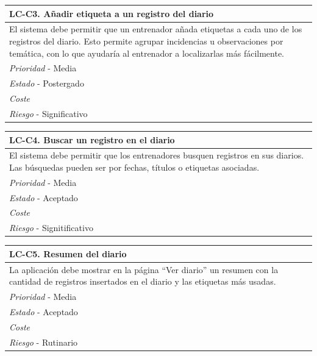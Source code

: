 	\begin{center}
		\begin{tabularx}{15cm}{|X|}
			\hline 
				\bf{LC-C3. Añadir etiqueta a un registro del diario}\\
			\hline
				El sistema debe permitir que un entrenador añada etiquetas a cada uno de los registros del diario. Esto permite agrupar incidencias u observaciones por temática, con lo que ayudaría al entrenador a localizarlas más fácilmente.\\
			\hline
				{\it Prioridad} - Media\\
			\hline
				{\it Estado} - Postergado\\
			\hline
				{\it Coste}\\
			\hline
				{\it Riesgo} - Significativo\\
			\hline
		\end{tabularx}
	\end{center}
	
	\begin{center}
		\begin{tabularx}{15cm}{|X|}
			\hline 
				\bf{LC-C4. Buscar un registro en el diario}\\
			\hline
				El sistema debe permitir que los entrenadores busquen registros en sus diarios. Las búsquedas pueden ser por fechas, títulos o etiquetas asociadas.\\
			\hline
				{\it Prioridad} - Media\\
			\hline
				{\it Estado} - Aceptado\\
			\hline
				{\it Coste}\\
			\hline
				{\it Riesgo} - Signitificativo\\
			\hline
		\end{tabularx}
	\end{center}
	
	\begin{center}
		\begin{tabularx}{15cm}{|X|}
			\hline 
				\bf{LC-C5. Resumen del diario}\\
			\hline
				La aplicación debe mostrar en la página ``Ver diario'' un resumen con la cantidad de registros insertados en el diario y las etiquetas más usadas.\\
			\hline
				{\it Prioridad} - Media\\
			\hline
				{\it Estado} - Aceptado\\
			\hline
				{\it Coste}\\
			\hline
				{\it Riesgo} - Rutinario\\
			\hline
		\end{tabularx}
	\end{center}
	
